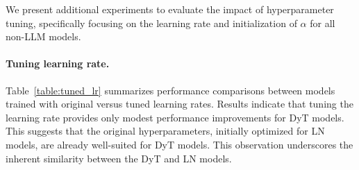 We present additional experiments to evaluate the impact of hyperparameter tuning, specifically focusing on the learning rate and initialization of $\alpha$ for all non-LLM models. 

\paragraph{Tuning learning rate.} Table~\ref{table:tuned_lr} summarizes performance comparisons between models trained with original versus tuned learning rates. Results indicate that tuning the learning rate provides only modest performance improvements for DyT models. This suggests that the original hyperparameters, initially optimized for LN models, are already well-suited for DyT models. This observation underscores the inherent similarity between the DyT and LN models.

